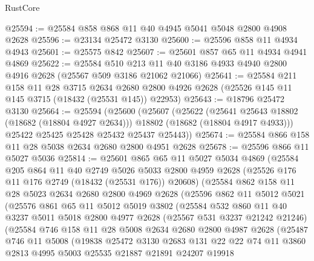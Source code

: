 \begin{lexlean}{RustCore}
\begin{coremodule}
@25594 := @25584 @858 @868 @11 @40 @4945 @5041 @5048 @2800 @4908 @2628
@25596 := @23134 @25472 @3130
@25600 := @25596 @858 @11 @4934 @4943
@25601 := @25575 @842
@25607 := @25601 @857 @65 @11 @4934 @4941 @4869
@25622 := @25584
    @510
    @213
    @11
    @40
    @3186
    @4933
    @4940
    @2800
    @4916
    @2628
    (@25567 @509 @3186 @21062 @21066)
@25641 := @25584
    @211
    @158
    @11
    @28
    @3715
    @2634
    @2680
    @2800
    @4926
    @2628
    (@25526 @145 @11 @145 @3715 (@18432 (@25531 @145)) @22953)
@25643 := @18796 @25472 @3130
@25664 := @25594
    (@25600
      (@25607
        (@25622
          (@25641 @25643 @18802 (@18682 (@18804 @4927 @2634)))
          @18802
          (@18682 (@18804 @4917 @4933)))
        @25422
        @25425
        @25428
        @25432
        @25437
        @25443))
@25674 := @25584 @866 @158 @11 @28 @5038 @2634 @2680 @2800 @4951 @2628
@25678 := @25596 @866 @11 @5027 @5036
@25814 := @25601
    @865
    @65
    @11
    @5027
    @5034
    @4869
    (@25584
      @205
      @864
      @11
      @40
      @2749
      @5026
      @5033
      @2800
      @4959
      @2628
      (@25526 @176 @11 @176 @2749 (@18432 (@25531 @176)) @20608)
      (@25584
        @862
        @158
        @11
        @28
        @5023
        @2634
        @2680
        @2800
        @4969
        @2628
        (@25596
          @862
          @11
          @5012
          @5021
          (@25576
            @861
            @65
            @11
            @5012
            @5019
            @3802
            (@25584
              @532
              @860
              @11
              @40
              @3237
              @5011
              @5018
              @2800
              @4977
              @2628
              (@25567 @531 @3237 @21242 @21246)
              (@25584
                @746
                @158
                @11
                @28
                @5008
                @2634
                @2680
                @2800
                @4987
                @2628
                (@25487
                  @746
                  @11
                  @5008
                  (@19838
                    @25472
                    @3130
                    @2683
                    @131
                    @22
                    @22
                    @74
                    @11
                    @3860
                    @2813
                    @4995
                    @5003
                    @25535
                    @21887
                    @21891
                    @24207
                    @19918

\end{coremodule}
\end{lexlean}
